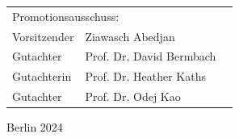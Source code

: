 \begin{titlepage}
	\begin{table}[h!] \normalsize
	    \begin{tabular}{@{} l l r @{}}
	    \multicolumn{2}{l}{Promotionsausschuss:} & \\
	    \multicolumn{1}{l}{Vorsitzender} & Ziawasch Abedjan\\
	    \multicolumn{1}{l}{Gutachter} & Prof. Dr. David Bermbach\\
	    \multicolumn{1}{l}{Gutachterin} & Prof. Dr. Heather Kaths\\
	    \multicolumn{1}{l}{Gutachter} & Prof. Dr. Odej Kao\\
	    \end{tabular}
	\end{table}
	\vspace{0.5cm}
	\centering
	\large Berlin 2024
\end{titlepage}
\afterpage{\null\thispagestyle{empty}\newpage}
